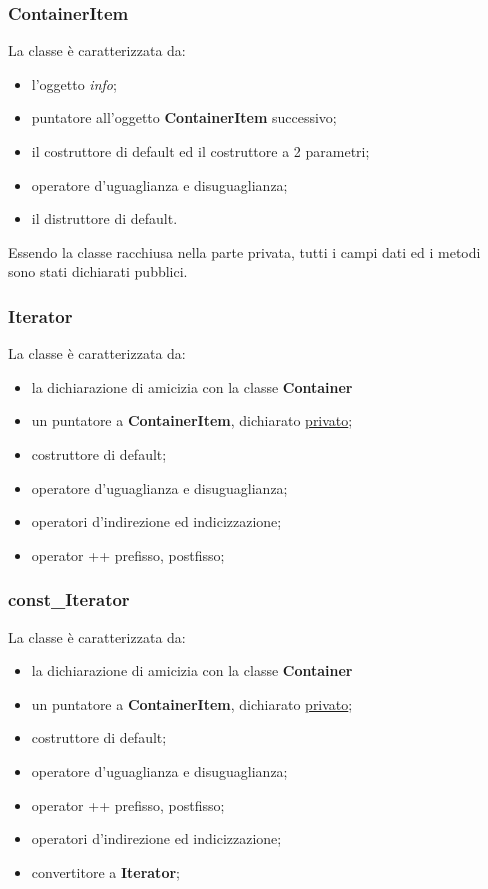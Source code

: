 {{			\subsubsection{ContainerItem}{
				La classe è caratterizzata da:
				\begin{itemize}\itemsep=0.5pt
					\item l'oggetto \textit{info};
					\item puntatore all'oggetto \textbf{ContainerItem} successivo;
					\item il costruttore di default ed il costruttore a 2 parametri;
					\item operatore d'uguaglianza e disuguaglianza;
					\item il distruttore di default.
				\end{itemize}
				Essendo la classe racchiusa nella parte privata, tutti i campi dati ed i metodi sono stati dichiarati pubblici.
			}
			\subsubsection{Iterator}{
				La classe è caratterizzata da:
				\begin{itemize}\itemsep=0.5pt
					\item la dichiarazione di amicizia con la classe \textbf{Container}
					\item un puntatore a \textbf{ContainerItem}, dichiarato \underline{privato};
					\item costruttore di default;
					\item operatore d'uguaglianza e disuguaglianza;
					\item operatori d'indirezione ed indicizzazione;
					\item operator ++ prefisso, postfisso;
				\end{itemize}
			}
			\subsubsection{const\_Iterator}{
				La classe è caratterizzata da:
				\begin{itemize}\itemsep=0.5pt
					\item la dichiarazione di amicizia con la classe \textbf{Container}
					\item un puntatore a \textbf{ContainerItem}, dichiarato \underline{privato};
					\item costruttore di default;
					\item operatore d'uguaglianza e disuguaglianza;
					\item operator ++ prefisso, postfisso;
					\item operatori d'indirezione ed indicizzazione;
					\item convertitore a \textbf{Iterator};
				\end{itemize}
			}
}}
